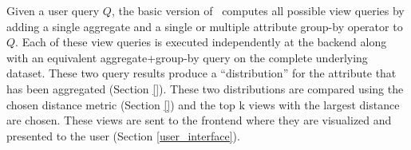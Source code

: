 Given a user query $Q$, the basic version of \SeeDB\ computes all possible view
queries by adding a single aggregate and a single or multiple attribute group-by
operator to $Q$. Each of these view queries is executed independently at the
backend along with an equivalent aggregate+group-by query on the complete
underlying dataset. These two query results produce a ``distribution'' for the
attribute that has been aggregated (Section \ref{}). These two distributions are
compared using the chosen distance metric (Section \ref{}) and the top k views
with the largest distance are chosen. These views are sent to the
frontend where they are visualized and presented to the user (Section
\ref{user_interface}).
% 
% 
% 

